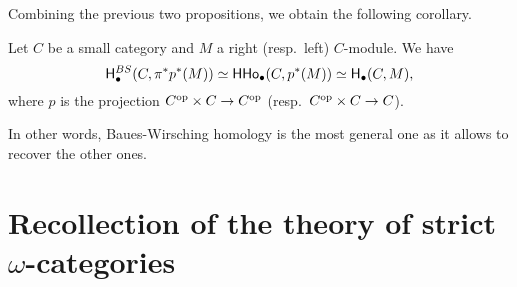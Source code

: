 \documentclass{amsart}
\newcommand{\M}{\mathcal{M}}
\newcommand{\B}{\mathcal{B}}
\newcommand{\Tw}[1]{\mathrm{Tw}(#1)}
\newcommand{\HHo}{\mathsf{HHo}}
\begin{document}
Combining the previous two propositions, we obtain the following corollary.
\begin{corollary}
  Let $C$ be a small category and $M$ a right (resp.\ left)
  $C$\nbd-module. We have
  \[
    \Ho^{BS}_{\bullet}(C,\pi^*p^*(M))\simeq \HHo_{\bullet}(C,p^*(M))\simeq \Ho_{\bullet}(C,M),
  \]
  where $p$ is the projection $C^{{\mathrm{op}}}\times C \to C^{{\mathrm{op}}}$ (resp.\
  $C^{{\mathrm{op}}}\times C \to C$).
\end{corollary}
In other words, Baues-Wirsching homology is the most general one as
it allows to recover the other ones.
\section{Recollection of the theory of strict $\omega$-categories}
\end{document}
